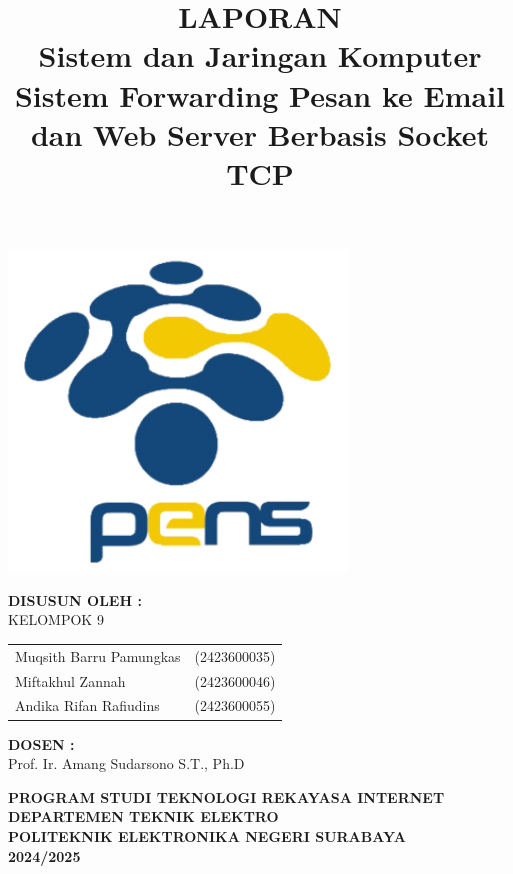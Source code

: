 \documentclass[12pt, a4paper]{article}
\title{\textbf{LAPORAN\\ Sistem dan Jaringan Komputer\\ Sistem Forwarding Pesan ke Email dan Web Server Berbasis Socket TCP }}
\author{}
\date{}
\begin{document}
\maketitle
\thispagestyle{empty}

\begin{center}
\vspace{-1.5cm}
\includegraphics[width=9cm]{Logo_PENS.png} 
\end{center}

\vspace{1cm}

\begin{center}
    \textbf{DISUSUN OLEH :}\\[0.5cm]
    KELOMPOK 9\\[0.7cm]
	\begin{tabular}{@{}l @{\hskip 2cm} r@{}}
        Muqsith Barru Pamungkas & (2423600035) \\
        Miftakhul Zannah & (2423600046) \\
        Andika Rifan Rafiudins & (2423600055) \\
    \end{tabular}
\end{center}
\vspace{0.1 cm}
\begin{center}
    \textbf{DOSEN :}\\
    Prof. Ir. Amang Sudarsono S.T., Ph.D
\end{center}

\vfill

\begin{center}
    \textbf{PROGRAM STUDI TEKNOLOGI REKAYASA INTERNET}\\
    \textbf{DEPARTEMEN TEKNIK ELEKTRO}\\
    \textbf{POLITEKNIK ELEKTRONIKA NEGERI SURABAYA}\\
    \textbf{2024/2025}
\end{center}
\end{document}
